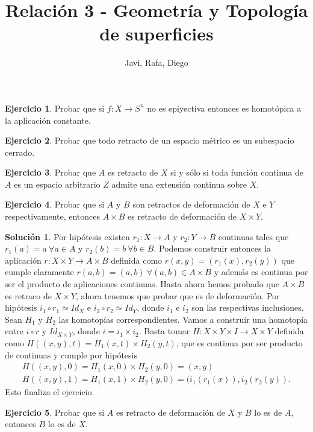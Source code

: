 \documentclass{article}
\theoremstyle{plain}
\theoremstyle{definition}
\newtheorem{exercise}{Ejercicio}
\newtheorem*{sol*}{Solución}
\begin{document}
\title{Relación 3 - Geometría y Topología de superficies }
\author{Javi, Rafa, Diego}
\maketitle
\begin{exercise}
Probar que si $f:X\to S^n$ no es epiyectiva entonces es homotópica a la aplicación constante.
\end{exercise}
\newpage
\begin{exercise}
Probar que todo retracto de un espacio métrico es un subespacio cerrado.
\end{exercise}
\newpage
\begin{exercise}
Probar que $A$ es retracto de $X$ si y sólo si toda función continua de $A$ es un espacio arbitrario $Z$ admite una extensión continua sobre $X$.
\end{exercise}
\newpage
\begin{exercise}
Probar que si $A$ y $B$ son retractos de deformación de $X$ e $Y$ respectivamente, entonces $A\times B$ es retracto de deformación de $X\times Y$.
\end{exercise}
\begin{sol*}
Por hipótesis existen $r_1:X\to A$ y $r_2:Y\to B$ continuas tales que $r_1(a)=a\ \forall a\in A$ y $r_2(b)=b\ \forall b\in B$. Podemos construir entonces la aplicación $r:X\times Y\to A\times B$ definida como $r(x,y)=(r_1(x),r_2(y))$ que cumple claramente $r(a,b)=(a,b)\ \forall (a,b)\in A\times B$ y además es continua por ser el producto de aplicaciones continuas. Hasta ahora hemos probado que $A\times B$ es retraco de $X\times Y$, ahora tenemos que probar que es de deformación. Por hipótesis $i_1\circ r_1\simeq Id_X$ e $i_2\circ r_2\simeq Id_Y$, donde $i_1$ e $i_2$ son las respectivas inclusiones. Sean $H_1$ y $H_2$ las homotopías correspondientes. Vamos a construir una homotopía entre $i\circ r$ y $Id_{X\times Y}$, donde $i=i_1\times i_2$. Basta tomar $H:X\times Y\times I\to X\times Y$ definida como $H((x,y),t)=H_1(x,t)\times H_2(y,t)$, que es continua por ser producto de continuas y cumple por hipótesis
\begin{gather*}
H((x,y),0)=H_1(x,0)\times H_2(y,0)= (x,y)\\
H((x,y),1)=H_1(x,1)\times H_2(y,0)= (i_1(r_1(x)),i_2(r_2(y)).
\end{gather*}
Esto finaliza el ejercicio.
\end{sol*}
\newpage
\begin{exercise}
Probar que si $A$ es retracto de deformación de $X$ y $B$ lo es de $A$, entonces $B$ lo es de $X$. 
\end{exercise}
\end{document}

